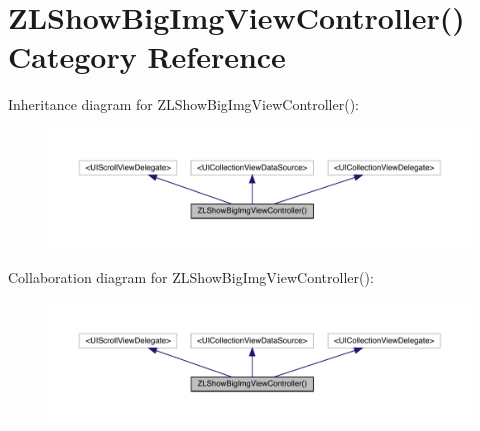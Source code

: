 \hypertarget{category_z_l_show_big_img_view_controller_07_08}{}\section{Z\+L\+Show\+Big\+Img\+View\+Controller() Category Reference}
\label{category_z_l_show_big_img_view_controller_07_08}


Inheritance diagram for Z\+L\+Show\+Big\+Img\+View\+Controller()\+:\nopagebreak
\begin{figure}[H]
\begin{center}
\leavevmode
\includegraphics[width=350pt]{category_z_l_show_big_img_view_controller_07_08__inherit__graph}
\end{center}
\end{figure}


Collaboration diagram for Z\+L\+Show\+Big\+Img\+View\+Controller()\+:\nopagebreak
\begin{figure}[H]
\begin{center}
\leavevmode
\includegraphics[width=350pt]{category_z_l_show_big_img_view_controller_07_08__coll__graph}
\end{center}
\end{figure}
